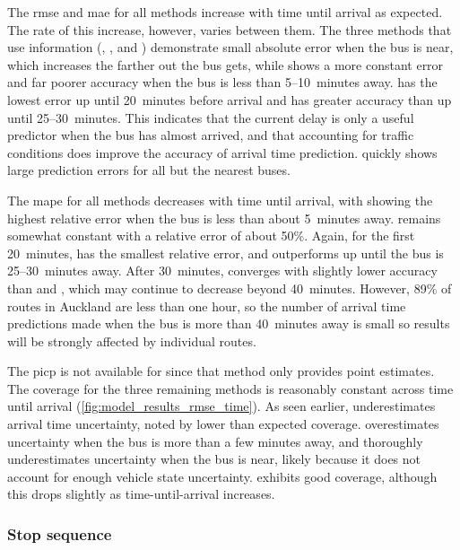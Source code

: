 The \gls{rmse} and \gls{mae} for all methods increase with time until arrival as expected. The rate of this increase, however, varies between them. The three methods that use \rt{} information (\Fpf{}, \Fnorm{}, and \Fsched{}) demonstrate small absolute error when the bus is near, which increases the farther out the bus gets, while \Fhist{} shows a more constant error and far poorer accuracy when the bus is less than 5--10~minutes away. \Fpf{} has the lowest error up until 20~minutes before arrival and has greater accuracy than \Fsched{} up until 25--30~minutes. This indicates that the current delay is only a useful predictor when the bus has almost arrived, and that accounting for \rt{} traffic conditions does improve the accuracy of arrival time prediction. \Fnorm{} quickly shows large prediction errors for all but the nearest buses.



The \gls{mape} for all methods decreases with time until arrival, with \Fhist{} showing the highest relative error when the bus is less than about 5~minutes away. \Fnorm{} remains somewhat constant with a relative error of about 50\%. Again, for the first 20~minutes, \Fpf{} has the smallest relative error, and outperforms \Fsched{} up until the bus is 25--30~minutes away. After 30~minutes, \Fpf{} converges with slightly lower accuracy than \Fhist{} and \Fsched{}, which may continue to decrease beyond 40~minutes. However, 89\% of routes in Auckland are less than one hour, so the number of arrival time predictions made when the bus is more than 40~minutes away is small so results will be strongly affected by individual routes.


The \gls{picp} is not available for \Fsched{} since that method only provides point estimates. The coverage for the three remaining methods is reasonably constant across time until arrival (\cref{fig:model_results_rmse_time}). As seen earlier, \Fpf{} underestimates arrival time uncertainty, noted by lower than expected coverage. \Fnorm{} overestimates uncertainty when the bus is more than a few minutes away, and thoroughly underestimates uncertainty when the bus is near, likely because it does not account for enough vehicle state uncertainty. \Fhist{} exhibits good coverage, although this drops slightly as time-until-arrival increases.


\subsubsection{Stop sequence}

